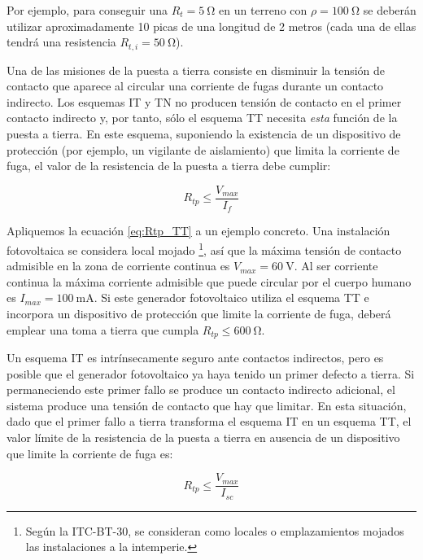 Por ejemplo, para conseguir una $R_{t}=\SI{5}{\ohm}$ en un terreno
con $\rho=\SI{100}{\ohm}$ se deberán utilizar aproximadamente 10
picas de una longitud de 2 metros (cada una de ellas tendrá una resistencia
$R_{t,i}=\SI{50}{\ohm}$). 

Una de las misiones de la puesta a tierra consiste en disminuir la
tensión de contacto que aparece al circular una corriente de fugas
durante un contacto indirecto. Los esquemas IT y TN no producen tensión
de contacto en el primer contacto indirecto y, por tanto, sólo el
esquema TT necesita \emph{esta} función de la puesta a tierra. En
este esquema, suponiendo la existencia de un dispositivo de protección
(por ejemplo, un vigilante de aislamiento) que limita la corriente
de fuga, el valor de la resistencia de la puesta a tierra debe cumplir:

\begin{equation}
R_{tp}\leq\frac{V_{max}}{I_{f}}\label{eq:Rtp_TT}\end{equation}


Apliquemos la ecuación \ref{eq:Rtp_TT} a un ejemplo concreto. Una
instalación fotovoltaica se considera local mojado%
\footnote{Según la ITC-BT-30, se consideran como locales o emplazamientos mojados
las instalaciones a la intemperie.%
}, así que la máxima tensión de contacto admisible en la zona de corriente
continua es $V_{max}=\SI{60}{\volt}$. Al ser corriente continua la
máxima corriente admisible que puede circular por el cuerpo humano
es $I_{max}=\SI{100}{\milli\ampere}$. Si este generador fotovoltaico
utiliza el esquema TT e incorpora un dispositivo de protección que
limite la corriente de fuga, deberá emplear una toma a tierra que
cumpla $R_{tp}\leq\SI{600}{\ohm}$.

Un esquema IT es intrínsecamente seguro ante contactos indirectos,
pero es posible que el generador fotovoltaico ya haya tenido un primer
defecto a tierra. Si permaneciendo este primer fallo se produce un
contacto indirecto adicional, el sistema produce una tensión de contacto
que hay que limitar. En esta situación, dado que el primer fallo a
tierra transforma el esquema IT en un esquema TT, el valor límite
de la resistencia de la puesta a tierra en ausencia de un dispositivo
que limite la corriente de fuga es:

\begin{equation}
R_{tp}\leq\frac{V_{max}}{I_{sc}}\label{eq:Rtp_IT2}\end{equation}

